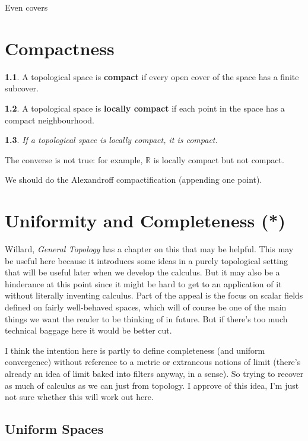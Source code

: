 \documentclass[oneside,english]{amsbook}
\numberwithin{section}{chapter}
\theoremstyle{plain}
\newtheorem{thm}{\protect\theoremname}
\theoremstyle{definition}
\newtheorem{defn}[thm]{\protect\definitionname}
\providecommand{\definitionname}{Definition}
\providecommand{\theoremname}{Theorem}
\begin{document}
Even covers

\chapter{Compactness}

\begin{defn}
	A topological space is \textbf{compact} if every open cover of the space has a finite subcover.
\end{defn}

\begin{defn}
	A topological space is \textbf{locally compact} if each point in the space has a compact neighbourhood.
\end{defn}

\begin{thm}
	If a topological space is locally compact, it is compact.
\end{thm}

The converse is not true: for example, $\mathbb{R}$ is locally compact but not compact.

We should do the Alexandroff compactification (appending one point).

\chapter{Uniformity and Completeness (*)}

Willard, \textit{General Topology} has a chapter on this that may be helpful. This may be useful here because it introduces some ideas in a purely topological setting that will be useful later when we develop the calculus. But it may also be a hinderance at this point since it might be hard to get to an application of it without literally inventing calculus. Part of the appeal is the focus on scalar fields defined on fairly well-behaved spaces, which will of course be one of the main things we want the reader to be thinking of in future. But if there's too much technical baggage here it would be better cut.

I think the intention here is partly to define completeness (and uniform convergence) without reference to a metric or extraneous notions of limit (there's already an idea of limit baked into filters anyway, in a sense). So trying to recover as much of calculus as we can just from topology. I approve of this idea, I'm just not sure whether this will work out here.

\section{Uniform Spaces}
\end{document}
